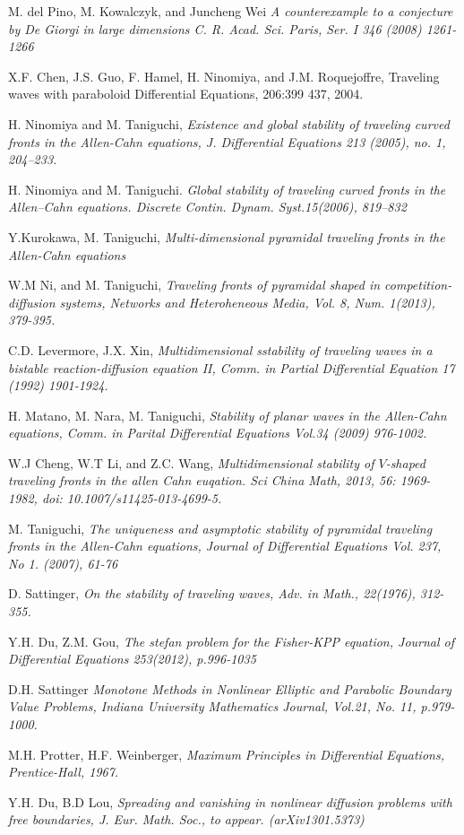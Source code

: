 \documentclass[12pt, a4paper]{article}
\numberwithin{equation}{section}
\begin{document}
\begin{CJK}{UTF8}{bkai}
\begin{thebibliography}{99}
	 M. del Pino, M. Kowalczyk, and Juncheng Wei {\it  A counterexample to a conjecture by De Giorgi in large dimensions C. R. Acad. Sci. Paris, Ser. I 346 (2008) 1261-1266}

	 X.F. Chen, J.S. Guo, F. Hamel, H. Ninomiya, and J.M. Roquejoffre,  Traveling waves with paraboloid
Differential Equations, 206:399 437, 2004.

	 H. Ninomiya and M. Taniguchi, {\it Existence and global stability of traveling curved fronts in the Allen-Cahn equations, J. Differential Equations 213 (2005), no. 1, 204--233.}

	 H. Ninomiya and M. Taniguchi. {\it Global stability of traveling curved fronts in the Allen–Cahn equations. Discrete Contin. Dynam. Syst.15(2006), 819–832}

	 Y.Kurokawa, M. Taniguchi, {\it Multi-dimensional pyramidal traveling fronts in the Allen-Cahn equations}

	 W.M Ni, and M. Taniguchi, {\it Traveling fronts of pyramidal shaped in competition-diffusion systems, Networks and Heteroheneous Media, Vol. 8, Num. 1(2013), 379-395.}

	 C.D. Levermore, J.X. Xin, {\it Multidimensional sstability of traveling waves in a bistable reaction-diffusion equation II, Comm. in Partial Differential Equation 17 (1992) 1901-1924.}

	 H. Matano, M. Nara, M. Taniguchi, {\it Stability of planar waves in the Allen-Cahn equations, Comm. in Parital Differential Equations Vol.34 (2009) 976-1002.}

	 W.J Cheng, W.T Li, and Z.C. Wang, {\it Multidimensional stability of $V$-shaped traveling fronts in the allen Cahn euqation. Sci China Math, 2013, 56: 1969-1982, doi: 10.1007/s11425-013-4699-5.}
	
	 M. Taniguchi, {\it The uniqueness and asymptotic stability of pyramidal traveling  fronts in the Allen-Cahn equations, Journal of Differential Equations Vol. 237, No 1. (2007), 61-76}

	 D. Sattinger, {\it On the stability of traveling waves, Adv. in Math., 22(1976), 312-355.}

	 Y.H. Du, Z.M. Gou, {\it The stefan problem for the Fisher-KPP equation, Journal of Differential Equations 253(2012), p.996-1035}

	 D.H. Sattinger {\it Monotone Methods in Nonlinear Elliptic and Parabolic Boundary Value Problems, Indiana University Mathematics Journal, Vol.21, No. 11, p.979-1000.}

	 M.H. Protter, H.F. Weinberger, {\it Maximum Principles in Differential Equations, Prentice-Hall, 1967.}

	 Y.H. Du, B.D Lou, {\it Spreading and vanishing in nonlinear diffusion problems with free boundaries, J. Eur. Math. Soc., to appear. (arXiv1301.5373)}
\end{thebibliography}
\end{CJK}
\end{document}
